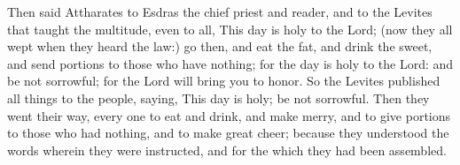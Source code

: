 {Then said Attharates to Esdras the chief priest and reader, and to the Levites that taught the multitude, even to all,
This day is holy to the Lord; (now they all wept when they heard the law:)
go then, and eat the fat, and drink the sweet, and send portions to those who have nothing;
for the day is holy to the Lord: and be not sorrowful; for the Lord will bring you to honor.
So the Levites published all things to the people, saying, This day is holy; be not sorrowful.
Then they went their way, every one to eat and drink, and make merry, and to give portions to those who had nothing, and to make great cheer;
because they
 understood the words wherein they were instructed, and for the which they had been assembled.
\par }